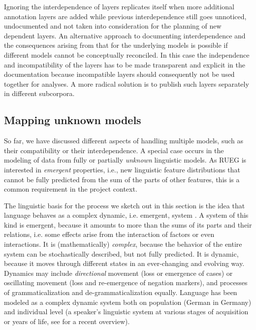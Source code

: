 \documentclass[output=paper,colorlinks,citecolor=brown]{langscibook}
\begin{document}
Ignoring the interdependence of layers replicates itself when more additional annotation layers are added while previous interdependence still goes unnoticed, undocumented and not taken into consideration for the planning of new dependent layers.
An alternative approach to documenting interdependence and the consequences arising from that for the underlying models is possible if different models cannot be conceptually reconciled. In this case the independence and incompatibility of the layers has to be made transparent and explicit in the documentation because incompatible layers should consequently not be used together for analyses. A more radical solution is to publish such layers separately in different subcorpora.

\subsection{Mapping unknown models} \label{sec:shadrovaetal:unknown_models}
\largerpage
So far, we have discussed different aspects of handling multiple models, such as their compatibility or their interdependence. A special case occurs in the modeling of data from fully or partially \textit{unknown} linguistic models. As RUEG is interested in \textit{emergent} properties, i.e., new linguistic feature distributions that cannot be fully predicted from the sum of the parts of other features, this is a common requirement in the project context. 

The linguistic basis for the process we sketch out in this section is the idea that language behaves as a complex dynamic, i.e. emergent, system \parencite[among others]{five2009language,ellis2009language,MassipBonet2013,croft2014studying}. A system of this kind is emergent, because it amounts to more than the sums of its parts and their relations, i.e. some effects arise from the interaction of factors or even interactions. It is (mathematically) \textit{complex}, because the behavior of the entire system can be stochastically described, but not fully predicted. It is dynamic, because it moves through different states in an ever-changing and evolving way. Dynamics may include \textit{directional} movement (loss or emergence of cases) or oscillating movement (loss and re-emergence of negation markers), and processes of grammaticalization and de-grammaticalization equally. Language has been modeled as a complex dynamic system both on population (German in Germany) and individual level (a speaker's linguistic system at various stages of acquisition or years of life, see \textcite{HiverAlHoorieEvans2022} for a recent overview).
\end{document}
